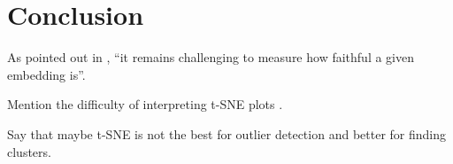 \chapter{Conclusion}\label{chapter:conclusion}

As pointed out in \cite{kobak21}, \enquote{it remains challenging to measure how faithful a given embedding is}.  


Mention the difficulty of interpreting t-SNE plots \cite{Wa16Distill}. 

Say that maybe t-SNE is not the best for outlier detection and better for finding clusters. 